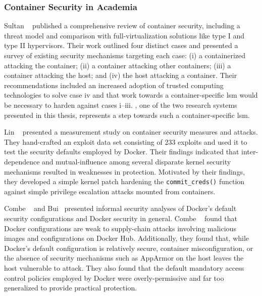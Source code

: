 


\subsubsection{Container Security in Academia}%
\label{sss:container-security-academia}

Sultan \etal~\cite{sultan2019_container_security} published a comprehensive review of
container security, including a threat model and comparison with full-virtualization
solutions like type I and type II hypervisors. Their work outlined four distinct cases and
presented a survey of existing security mechanisms targeting each case: (i)
a containerized attacking the container; (ii) a container attacking other containers;
(iii) a container attacking the host; and (iv) the host attacking a container. Their
recommendations included an increased adoption of trusted computing technologies to solve
case iv and that work towards a container-specific \gls{lsm} would be necessary to harden
against cases i--iii. \bpfcontain{}, one of the two research systems presented in this thesis,
represents a step towards such a container-specific \gls{lsm}.

Lin \etal~\cite{lin2018_container_security} presented a measurement study on container
security measures and attacks. They hand-crafted an exploit data set consisting of 233
exploits and used it to test the security defaults employed by Docker. Their findings
indicated that inter-dependence and mutual-influence among several disparate kernel
security mechanisms resulted in weaknesses in protection. Motivated by their findings,
they developed a simple kernel patch hardening the \texttt{commit\_creds()} function
against simple privilege escalation attacks mounted from containers.

Combe \etal~\cite{combe2016_to_docker} and Bui~\cite{bui2015_docker_analysis} presented
informal security analyses of Docker's default security configurations and Docker security
in general. Combe \etal~\cite{combe2016_to_docker} found that Docker configurations are
weak to supply-chain attacks involving malicious images and configurations on Docker Hub.
Additionally, they found that, while Docker's default configuration is relatively secure,
container misconfiguration, or the absence of security mechanisms such as AppArmor on the
host leaves the host vulnerable to attack. They also found that the default mandatory
access control policies employed by Docker were overly-permissive and far too generalized
to provide practical protection.

